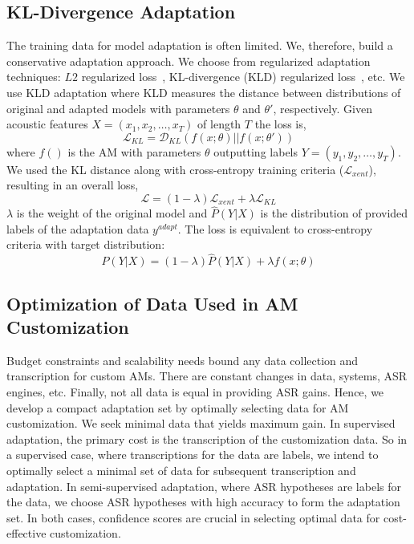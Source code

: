 \documentclass[a4paper]{article}
\begin{document}
\subsection{KL-Divergence Adaptation}
The training data for model adaptation is often limited. We, therefore, build a conservative adaptation approach. We choose from regularized adaptation techniques: $L2$ regularized loss~\cite{liao2013speaker}, KL-divergence (KLD) regularized loss~\cite{YuKL2013}, etc. We use KLD adaptation where KLD measures the distance between distributions of original and adapted models with parameters $\theta$ and $\theta'$, respectively. Given acoustic features $X= (x_1,x_2,\dots,x_T)$ of length $T$ the loss is,
\vspace{-0.5em}
\begin{equation}
    \mathcal{L}_{KL} = \mathcal{D}_{KL}(f(x;\theta)||f(x;\theta'))
\end{equation}
where $f()$ is the AM with parameters $\theta$ outputting labels $Y=(y_1,y_2,\dots,y_T)$. 
We used the KL distance along with cross-entropy training criteria ($\mathcal{L}_{xent}$), resulting in an overall loss,
\vspace{-0.5em}
\begin{equation}
    \mathcal{L} = (1-\lambda)\mathcal{L}_{xent} + \lambda \mathcal{L}_{KL}
\end{equation}
$\lambda$ is the weight of the original model and $\hat{P}(Y|X)$ is the distribution of provided labels of the adaptation data $y^{adapt}$. The loss is equivalent to cross-entropy criteria with target distribution:
\begin{equation}
\label{eqn:distribution}
    P(Y|X) = (1-\lambda)\hat{P}(Y|X) + \lambda f(x;\theta)
\end{equation}
\subsection{Optimization of Data Used in AM Customization}
\label{sec:optimization}
Budget constraints and scalability needs bound any data collection and transcription for custom AMs. There are constant changes in data, systems, ASR engines, etc. Finally, not all data is equal in providing ASR gains. Hence, we develop a compact adaptation set by optimally selecting data for AM customization. We seek minimal data that yields maximum gain. In supervised adaptation, the primary cost is the transcription of the customization data. So in a supervised case, where transcriptions for the data are labels, we intend to optimally select a minimal set of data for subsequent transcription and adaptation. In semi-supervised adaptation, where ASR hypotheses are labels for the data, we choose ASR hypotheses with high accuracy to form the adaptation set. In both cases, confidence scores are crucial in selecting optimal data for cost-effective customization.
\end{document}

